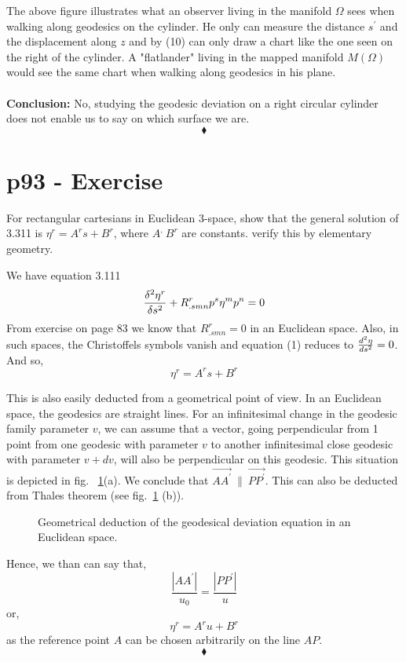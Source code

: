 The above figure illustrates what an observer living in the manifold $\Omega$ sees when walking along geodesics on the cylinder.  He only can measure the distance $s^{'}$ and the displacement along $z$ and by (10) can only draw a chart like the one seen on the right of the cylinder. A "flatlander" living in the mapped manifold $M(\Omega)$ would see the same chart when walking along geodesics in his plane.\\\\
\textbf{Conclusion:} No, studying the geodesic deviation on a right circular cylinder does not enable us to say on which surface we are.
$$\blacklozenge$$
\newpage

\section{p93 - Exercise}
\begin{tcolorbox}
For rectangular cartesians in Euclidean 3-space, show that the general solution of 3.311 is $\eta^r = A^r s+B^r $, where $A^, \ B^r$ are constants. verify this by elementary geometry. 
\end{tcolorbox}
We have equation 3.111
\begin{align}
\fdv[2]{\eta^r}{s}+ R^r_{.smn} p^s \eta^m p^n=0
\end{align}
From exercise on page 83 we know that $R^r_{.smn}=0$ in an Euclidean space. Also, in such spaces, the Christoffels symbols vanish and equation (1) reduces to $ \dv[2]{\eta}{s} = 0$. And so, $$\eta^r = A^r s+B^r $$

This is also easily deducted from a geometrical point of view. In an Euclidean space, the geodesics are straight lines. For an infinitesimal change in the geodesic family parameter $v$, we can assume that a vector, going perpendicular from 1 point from one geodesic with parameter $v$  to another infinitesimal close  geodesic with parameter $v+dv$,  will also be perpendicular on this geodesic. This situation is depicted in fig. ~\ref{fig:fig_p93_16}(a). We conclude that $\overrightarrow{AA^{'}} \ \parallel \ \overrightarrow{PP^{'}}$. This can also be deducted from Thales theorem (see fig.~\ref{fig:fig_p93_16} (b)). 
\begin{figure}[H]%
    \centering
    \subfloat[]{}
	\qquad
    \subfloat[]{}
\caption{Geometrical deduction of the geodesical deviation equation in an Euclidean space.}
\label{fig:fig_p93_16}
\end{figure}
Hence, we than can say that,
$$ \frac{\left|AA^{'}\right|}{u_0}=\frac{\left|PP^{'}\right|}{u}  $$
or, $$ \eta^r = A^r u + B^r $$ as the reference point $A$ can be chosen arbitrarily on the line $AP$.
$$\blacklozenge$$
\newpage

